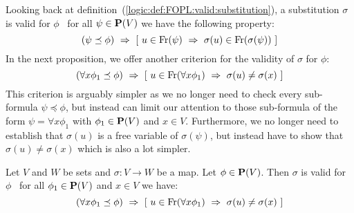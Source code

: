 Looking back at
definition~(\ref{logic:def:FOPL:valid:substitution}), a substitution
$\sigma$ is valid for $\phi$ \ifand\ for all $\psi\in\mbox{${\bf P}(V)$}$ we have
the following property:
    \[
    (\psi\preceq\phi)\ \Rightarrow\ [\
    u\in\free(\psi)\ \Rightarrow\
    \sigma(u)\in\free(\sigma(\psi))\ ]
    \]
In the next proposition, we offer another criterion for the validity
of $\sigma$ for $\phi$:
    \[
    (\forall x\phi_{1}\preceq\phi)\ \Rightarrow\ [\
    u\in\free(\forall x\phi_{1})\ \Rightarrow\
    \sigma(u)\neq\sigma(x)\ ]
    \]
This criterion is arguably simpler as we no longer need to check
every sub-formula $\psi\preceq\phi$, but instead can limit our
attention to those sub-formula of the form $\psi=\forall x\phi_{1}$
with $\phi_{1}\in\mbox{${\bf P}(V)$}$ and $x\in V$. Furthermore, we no longer need
to establish that $\sigma(u)$ is a free variable of $\sigma(\psi)$,
but instead have to show that $\sigma(u)\neq\sigma(x)$ which is also
a lot simpler.
\begin{prop}\label{logic:prop:FOPL:validsub:criterion}
Let $V$ and $W$ be sets and $\sigma:V\to W$ be a map. Let
$\phi\in\mbox{${\bf P}(V)$}$. Then $\sigma$ is valid for $\phi$ \ifand\ for all
$\phi_{1}\in\mbox{${\bf P}(V)$}$ and $x\in V$ we have:
    \[
    (\forall x\phi_{1}\preceq\phi)\ \Rightarrow\ [\
    u\in\free(\forall x\phi_{1})\ \Rightarrow\
    \sigma(u)\neq\sigma(x)\ ]
    \]
\end{prop}

